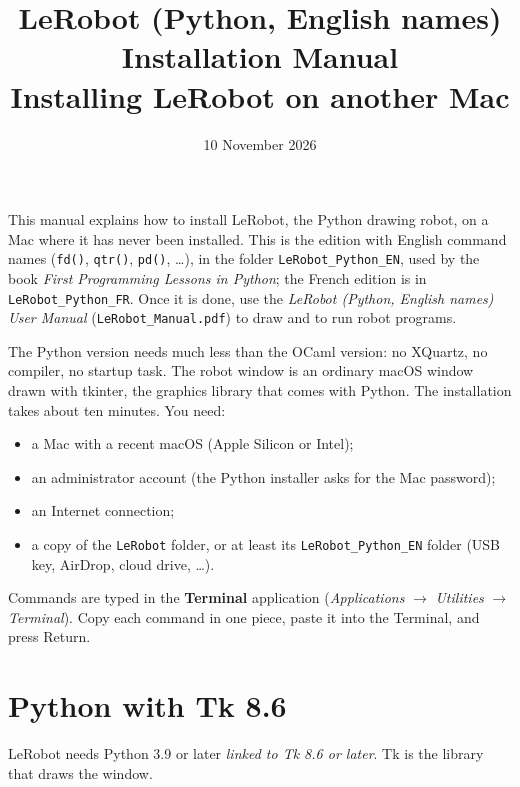 \documentclass[11pt,a4paper]{article}
\title{LeRobot (Python, English names) Installation Manual\\[0.3em]\large Installing LeRobot on another Mac}
\author{}
\date{10 November 2026}
\newcommand{\kbd}[1]{\texttt{#1}}
\begin{document}
\maketitle

This manual explains how to install LeRobot, the Python drawing robot, on a
Mac where it has never been installed. This is the edition with English command names
(\kbd{fd()}, \kbd{qtr()}, \kbd{pd()}, \dots), in the folder
\kbd{LeRobot\_Python\_EN}, used by the book \emph{First Programming Lessons in
Python}; the French edition is in \kbd{LeRobot\_Python\_FR}. Once it is done, use the
\emph{LeRobot (Python, English names) User Manual} (\kbd{LeRobot\_Manual.pdf}) to draw and
to run robot programs.

The Python version needs much less than the OCaml version: no XQuartz, no
compiler, no startup task. The robot window is an ordinary macOS window
drawn with tkinter, the graphics library that comes with Python. The
installation takes about ten minutes. You need:
\begin{itemize}
\item a Mac with a recent macOS (Apple Silicon or Intel);
\item an administrator account (the Python installer asks for the Mac
  password);
\item an Internet connection;
\item a copy of the \kbd{LeRobot} folder, or at least its
  \kbd{LeRobot\_Python\_EN} folder (USB key, AirDrop, cloud drive, \dots).
\end{itemize}

Commands are typed in the \textbf{Terminal} application
(\emph{Applications} $\rightarrow$ \emph{Utilities} $\rightarrow$
\emph{Terminal}). Copy each command in one piece, paste it into the
Terminal, and press Return.

\tableofcontents

\section{Python with Tk 8.6}

LeRobot needs Python 3.9 or later \emph{linked to Tk 8.6 or later}. Tk is the
library that draws the window.
\end{document}
